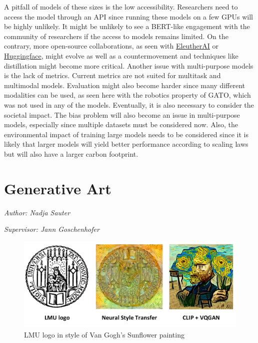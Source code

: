 \documentclass[
]{krantz}
\begin{document}
A pitfall of models of these sizes is the low accessibility. Researchers need to access the model through an API since running these models on a few GPUs will be highly unlikely. It might be unlikely to see a BERT-like engagement with the community of researchers if the access to models remains limited. On the contrary, more open-source collaborations, as seen with \href{www.eleuther.ai}{EleutherAI} or \href{www.huggingface.co}{Huggingface}, might evolve as well as a countermovement and techniques like distillation \citep{Hinton2015} might become more critical.
Another issue with multi-purpose models is the lack of metrics. Current metrics are not suited for multitask and multimodal models. Evaluation might also become harder since many different modalities can be
used, as seen here with the robotics property of GATO, which was not used in any of the models.
Eventually, it is also necessary to consider the societal impact. The bias problem will also become an issue in multi-purpose models, especially since multiple datasets must be considered now. Also, the environmental impact of training large models needs to be considered since it is likely that larger models will yield better performance according to scaling laws \citep{Reed2022} but will also have a larger carbon footprint.

\hypertarget{c03-04-usecase}{%
\section{Generative Art}\label{c03-04-usecase}}

\emph{Author: Nadja Sauter}

\emph{Supervisor: Jann Goschenhofer}

\begin{figure}

{\centering \includegraphics[width=0.9\linewidth]{./figures/03-chapter3/Logo} 

}

\caption{LMU logo in style of Van Gogh's Sunflower painting}\label{fig:Logo}
\end{figure}
\end{document}
